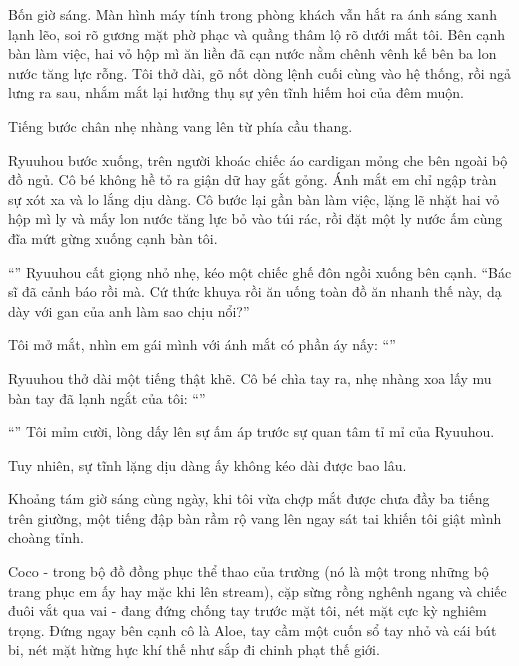 \documentclass[../main.tex]{subfiles}
\begin{document}
Bốn giờ sáng. Màn hình máy tính trong phòng khách vẫn hắt ra ánh sáng xanh lạnh lẽo, soi rõ gương mặt phờ phạc và quầng thâm lộ rõ dưới mắt tôi. Bên cạnh bàn làm việc, hai vỏ hộp mì ăn liền đã cạn nước nằm chênh vênh kế bên ba lon nước tăng lực rỗng. Tôi thở dài, gõ nốt dòng lệnh cuối cùng vào hệ thống, rồi ngả lưng ra sau, nhắm mắt lại hưởng thụ sự yên tĩnh hiếm hoi của đêm muộn.

Tiếng bước chân nhẹ nhàng vang lên từ phía cầu thang.

Ryuuhou bước xuống, trên người khoác chiếc áo cardigan mỏng che bên ngoài bộ đồ ngủ. Cô bé không hề tỏ ra giận dữ hay gắt gỏng. Ánh mắt em chỉ ngập tràn sự xót xa và lo lắng dịu dàng. Cô bước lại gần bàn làm việc, lặng lẽ nhặt hai vỏ hộp mì ly và mấy lon nước tăng lực bỏ vào túi rác, rồi đặt một ly nước ấm cùng đĩa mứt gừng xuống cạnh bàn tôi.

``'' Ryuuhou cất giọng nhỏ nhẹ, kéo một chiếc ghế đôn ngồi xuống bên cạnh. ``Bác sĩ đã cảnh báo rồi mà. Cứ thức khuya rồi ăn uống toàn đồ ăn nhanh thế này, dạ dày với gan của anh làm sao chịu nổi?''

Tôi mở mắt, nhìn em gái mình với ánh mắt có phần áy nấy: ``''

Ryuuhou thở dài một tiếng thật khẽ. Cô bé chìa tay ra, nhẹ nhàng xoa lấy mu bàn tay đã lạnh ngắt của tôi: ``''

``'' Tôi mỉm cười, lòng dấy lên sự ấm áp trước sự quan tâm tỉ mỉ của Ryuuhou.

Tuy nhiên, sự tĩnh lặng dịu dàng ấy không kéo dài được bao lâu.

Khoảng tám giờ sáng cùng ngày, khi tôi vừa chợp mắt được chưa đầy ba tiếng trên giường, một tiếng đập bàn rầm rộ vang lên ngay sát tai khiến tôi giật mình choàng tỉnh.

Coco - trong bộ đồ đồng phục thể thao của trường (nó là một trong những bộ trang phục em ấy hay mặc khi lên stream), cặp sừng rồng nghênh ngang và chiếc đuôi vắt qua vai - đang đứng chống tay trước mặt tôi, nét mặt cực kỳ nghiêm trọng. Đứng ngay bên cạnh cô là Aloe, tay cầm một cuốn sổ tay nhỏ và cái bút bi, nét mặt hừng hực khí thế như sắp đi chinh phạt thế giới.
\end{document}
